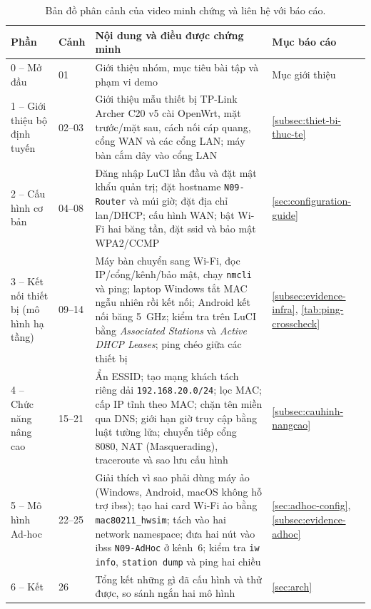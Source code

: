 \begin{table}[htbp]
  \centering\footnotesize
  \caption{Bản đồ phân cảnh của video minh chứng và liên hệ với báo cáo.}
  \label{tab:bandoscanh}
  \begin{tabularx}{\linewidth}{@{} L{0.55} L{0.95} L{1.8} L{0.7} @{}}
    \toprule
    \textbf{Phần} & \textbf{Cảnh} & \textbf{Nội dung và điều được chứng minh} &
    \textbf{Mục báo cáo} \\
     -- Mở đầu & 01 & Giới thiệu nhóm, mục tiêu bài tập và phạm vi demo &
      Mục giới thiệu \\
    1 -- Giới thiệu bộ định tuyến & 02--03 & Giới thiệu mẫu thiết bị TP-Link Archer C20 v5 cài
      OpenWrt, mặt trước/mặt sau, cách nối cáp quang, cổng WAN và các cổng LAN;
      máy bàn cắm dây vào cổng LAN & \ref{subsec:thiet-bi-thuc-te} \\
    2 -- Cấu hình cơ bản & 04--08 & Đăng nhập LuCI lần đầu và đặt mật khẩu quản
      trị; đặt hostname \texttt{N09-Router} và múi giờ; đặt địa chỉ
      \ac{lan}/DHCP; cấu hình WAN; bật Wi-Fi hai băng tần, đặt \ac{ssid} và bảo
      mật WPA2/CCMP & \ref{sec:configuration-guide} \\
    3 -- Kết nối thiết bị (mô hình hạ tầng) & 09--14 & Máy bàn chuyển sang Wi-Fi,
      đọc IP/cổng/kênh/bảo mật, chạy \texttt{nmcli} và ping; laptop Windows tắt
      MAC ngẫu nhiên rồi kết nối; Android kết nối băng 5~GHz; kiểm tra trên LuCI
      bằng \emph{Associated Stations} và \emph{Active DHCP Leases}; ping chéo
      giữa các thiết bị & \ref{subsec:evidence-infra},
      \ref{tab:ping-crosscheck} \\
    4 -- Chức năng nâng cao & 15--21 & Ẩn ESSID; tạo mạng khách tách riêng dải
      \texttt{192.168.20.0/24}; lọc MAC; cấp IP tĩnh theo MAC; chặn tên miền qua
      DNS; giới hạn giờ truy cập bằng luật tường lửa; chuyển tiếp cổng 8080, NAT
      (Masquerading), traceroute và sao lưu cấu hình &
      \ref{subsec:cauhinh-nangcao} \\
    5 -- Mô hình Ad-hoc & 22--25 & Giải thích vì sao phải dùng máy ảo (Windows,
      Android, macOS không hỗ trợ \ac{ibss}); tạo hai card Wi-Fi ảo bằng
      \texttt{mac80211\_hwsim}; tách vào hai network namespace; đưa hai nút vào
      \ac{ibss} \texttt{N09-AdHoc} ở kênh~6; kiểm tra \texttt{iw info},
      \texttt{station dump} và ping hai chiều &
      \ref{sec:adhoc-config}, \ref{subsec:evidence-adhoc} \\
    6 -- Kết & 26 & Tổng kết những gì đã cấu hình và thử được, so sánh ngắn hai
      mô hình & \ref{sec:arch} \\
    \bottomrule
  \end{tabularx}
\end{table}

